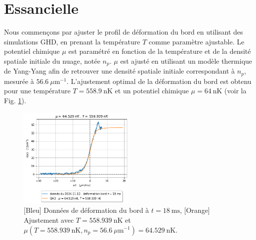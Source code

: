 \documentclass[a3, 10pt,twoside]{article}          %
\theoremstyle{plain}
\theoremstyle{definition}
\theoremstyle{remark}
\theoremstyle{definition} %
\begin{document}
	\section{Essancielle}
	
	
	Nous commençons par ajuster le profil de déformation du bord en utilisant des simulations GHD, en prenant la température $T$ comme paramètre ajustable. Le potentiel chimique $\mu$ est paramétré en fonction de la température et de la densité spatiale initiale du nuage, notée $n_p$.  $\mu$  est ajusté en utilisant un modèle thermique de Yang-Yang afin de retrouver une densité spatiale initiale correspondant à $n_p$, mesurée à $56.6 ~\mu \text{m}^{-1}$. L'ajustement optimal de la déformation du bord est obtenu pour une température $T = 558.9~\text{nK}$ et un potentiel chimique $\mu = 64~\text{nK}$ (voir la Fig. \ref{fig:simul_deformation}).


	
	\begin{figure}[ht]
    \centering
    \includegraphics[width=0.5\textwidth]{Figures/simul_deformation}
    \caption{{\color{blue} [Bleu] Données de déformation du bord à $t = 18~\text{ms}$}, {\color{orange}[Orange] Ajustement avec $T = 558.939~\text{nK}$ et $\mu(T = 558.939~\text{nK}, n_p = 56.6~\mu \text{m}^{-1}) = 64.529~\text{nK}$}.}
    \label{fig:simul_deformation}
	\end{figure}
\end{document}
